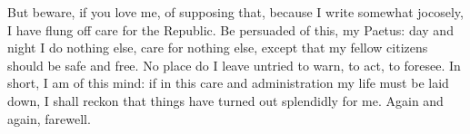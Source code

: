  But beware, if you love me, of supposing that, because I write somewhat jocosely, I have flung off care for the Republic. Be persuaded of this, my Paetus: day and night I do nothing else, care for nothing else, except that my fellow citizens should be safe and free. No place do I leave untried to warn, to act, to foresee. In short, I am of this mind: if in this care and administration my life must be laid down, I shall reckon that things have turned out splendidly for me. Again and again, farewell.
